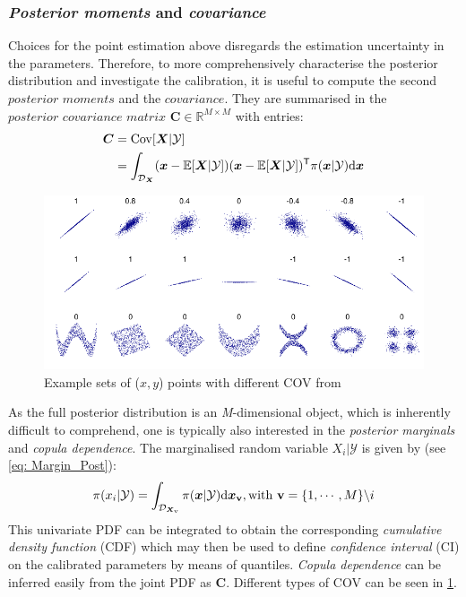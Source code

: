 \subsubsection{\textit{Posterior moments} and \textit{covariance}}
Choices for the point estimation above disregards the estimation uncertainty in the parameters. Therefore, to more comprehensively characterise the posterior distribution and investigate the calibration, it is useful to compute the second $\textit{posterior moments}$ and the $\textit{covariance}$. They are summarised in the $\textit{posterior covariance matrix}$ $\boldsymbol{C} \in \mathbb{R}^{M \times M}$ with entries:
\begin{equation}
    \label{eq: COV}
    \begin{aligned}
    \boldsymbol{C}  &= {\rm{Cov}}[\boldsymbol{X}|\mathcal{Y}] \\
            &=\int_{\mathcal{D}_{\boldsymbol{X}}} 
            (\boldsymbol{x} - \mathbb{E}[\boldsymbol{X}|\mathcal{Y}])(\boldsymbol{x} - \mathbb{E}[\boldsymbol{X}|\mathcal{Y}])^{\mathsf{T}} \pi(\boldsymbol{x}|\mathcal{Y}) {\rm{d}} \boldsymbol{x} 
    \end{aligned}  
\end{equation}
\begin{figure}[htbp]
    \centering
    \includegraphics[width = 140mm]{Figures/figure-COV.pdf}
\caption{Example sets of ($x,y$) points with different \acrshort{COV} from \cite{Wikipedia}}
    \label{fig: COV}
\end{figure}
As the full posterior distribution is an \textit{M}-dimensional object, which is inherently difficult to comprehend, one is typically also interested in the \textit{posterior marginals} and \textit{copula dependence}. The marginalised random variable $X_{i}|\mathcal{Y}$ is given by (see \cref{eq: Margin_Post}):
\begin{equation}
    \label{eq: Margin_Post}
    \pi(x_{i}|\mathcal{Y}) = \int_{\mathcal{D}_{\boldsymbol{X}_{\rm{\boldsymbol{v}}}}}
          \pi(\boldsymbol{x}|\mathcal{Y}){\rm{d}} \boldsymbol{x_{\rm{\boldsymbol{v}}}}, {\rm{with}} \ \boldsymbol{\mathrm{v}} = \{1,\cdots,M\} \backslash i  
\end{equation}
This univariate \acrshort{PDF} can be integrated to obtain the corresponding \textit{cumulative density function} (\acrshort{CDF}) which may then be used to define \textit{confidence interval} (\acrshort{CI}) on the calibrated parameters by means of quantiles. \textit{Copula dependence} can be inferred easily from the joint \acrshort{PDF} as $\boldsymbol{C}$. Different types of \acrshort{COV} can be seen in \cref{fig: COV}.

